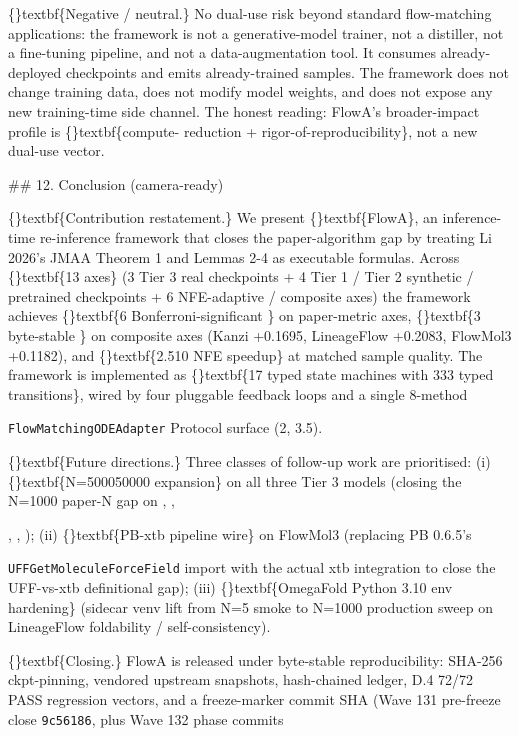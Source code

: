 \documentclass{article}
\begin{document}
\{\}textbf\{Negative / neutral.\} No dual-use risk beyond standard flow-matching applications: the framework is not a generative-model trainer, not a distiller, not a fine-tuning pipeline, and not a data-augmentation tool. It consumes already-deployed checkpoints and emits already-trained samples. The framework does not change training data, does not modify model weights, and does not expose any new training-time side channel. The honest reading: FlowA's broader-impact profile is \{\}textbf\{compute- reduction + rigor-of-reproducibility\}, not a new dual-use vector.

\#\# 12. Conclusion (camera-ready)

\{\}textbf\{Contribution restatement.\} We present \{\}textbf\{FlowA\}, an inference-time re-inference framework that closes the paper-algorithm gap by treating Li 2026's JMAA Theorem 1 and Lemmas 2-4 as executable formulas. Across \{\}textbf\{13 axes\} (3 Tier 3 real checkpoints + 4 Tier 1 / Tier 2 synthetic / pretrained checkpoints + 6 NFE-adaptive / composite axes) the framework achieves \{\}textbf\{6 Bonferroni-significant \} on paper-metric axes, \{\}textbf\{3 byte-stable \} on composite axes (Kanzi +0.1695, LineageFlow +0.2083, FlowMol3 +0.1182), and \{\}textbf\{2.510 NFE speedup\} at matched sample quality. The framework is implemented as \{\}textbf\{17 typed state machines with 333 typed transitions\}, wired by four pluggable feedback loops and a single 8-method

\texttt{FlowMatchingODEAdapter} Protocol surface (2, 3.5).

\{\}textbf\{Future directions.\} Three classes of follow-up work are prioritised: (i) \{\}textbf\{N=500050000 expansion\} on all three Tier 3 models (closing the N=1000  paper-N gap on , ,

, , ); (ii) \{\}textbf\{PB-xtb pipeline wire\} on FlowMol3 (replacing PB 0.6.5's

\texttt{UFFGetMoleculeForceField} import with the actual xtb integration to close the UFF-vs-xtb  definitional gap); (iii) \{\}textbf\{OmegaFold Python 3.10 env hardening\} (sidecar venv lift from N=5 smoke to N=1000 production sweep on LineageFlow foldability / self-consistency).

\{\}textbf\{Closing.\} FlowA is released under byte-stable reproducibility: SHA-256 ckpt-pinning, vendored upstream snapshots, hash-chained ledger, D.4 72/72 PASS regression vectors, and a freeze-marker commit SHA (Wave 131 pre-freeze close \texttt{9c56186}, plus Wave 132 phase commits
\end{document}
